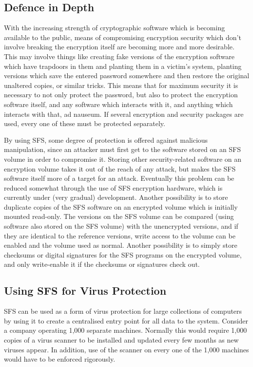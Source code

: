 \subsection{Defence in Depth}

With the increasing strength of cryptographic software which is becoming
available to the public, means of compromising encryption security which don't
involve breaking the encryption itself are becoming more and more desirable.
This may involve things like creating fake versions of the encryption software
which have trapdoors in them and planting them in a victim's system, planting
versions which save the entered password somewhere and then restore the
original unaltered copies, or similar tricks.  This means that for maximum
security it is necessary to not only protect the password, but also to protect
the encryption software itself, and any software which interacts with it, and
anything which interacts with that, ad nauseum.  If several encryption and
security packages are used, every one of these must be protected separately.

By using SFS, some degree of protection is offered against malicious
manipulation, since an attacker must first get to the software stored on an SFS
volume in order to compromise it.  Storing other security-related software on
an encryption volume takes it out of the reach of any attack, but makes the SFS
software itself more of a target for an attack.  Eventually this problem can be
reduced somewhat through the use of SFS encryption hardware, which is currently
under (very gradual) development.  Another possibility is to store duplicate
copies of the SFS software on an encrypted volume which is initially mounted
read-only.  The versions on the SFS volume can be compared (using software also
stored on the SFS volume) with the unencrypted versions, and if they are
identical to the reference versions, write access to the volume can be enabled
and the volume used as normal.  Another possibility is to simply store
checksums or digital signatures for the SFS programs on the encrypted volume,
and only write-enable it if the checksums or signatures check out.

\subsection{Using SFS for Virus Protection}

SFS can be used as a form of virus protection for large collections of
computers by using it to create a centralised entry point for all data to the
system.  Consider a company operating 1,000 separate machines.  Normally this
would require 1,000 copies of a virus scanner to be installed and updated every
few months as new viruses appear.  In addition, use of the scanner on every one
of the 1,000 machines would have to be enforced rigorously.

